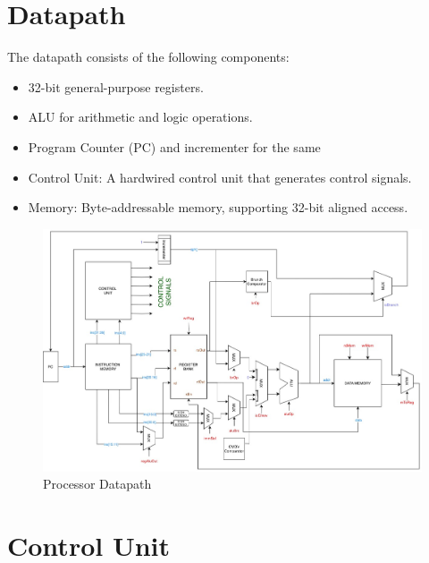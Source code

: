 \documentclass{article}
\begin{document}
\section{Datapath}
The datapath consists of the following components:
\begin{itemize}
    \item 32-bit general-purpose registers.
    \item ALU for arithmetic and logic operations.
    \item Program Counter (PC) and incrementer for the same
    \item Control Unit: A hardwired control unit that generates control signals.
    \item Memory: Byte-addressable memory, supporting 32-bit aligned access.
\end{itemize}
\begin{figure}[H]
    \centering
    \includegraphics[width=\textwidth]{datapath.jpg}
    \caption{Processor Datapath}
\end{figure}

\section{Control Unit}
\end{document}
